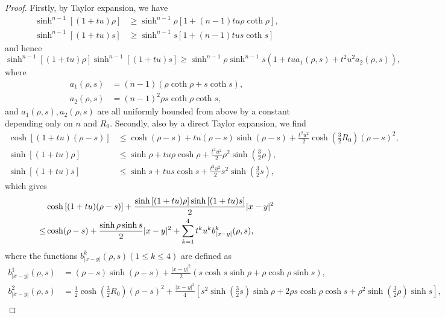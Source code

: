 \documentclass[11pt,reqno]{amsart}
\theoremstyle{definition}
\theoremstyle{remark}
\numberwithin{equation}{section}
\renewcommand{\(}{\left(}
\renewcommand{\)}{\right)}
\renewcommand{\-}{\overline}
\begin{document}
\begin{proof}
	Firstly, by Taylor expansion, we have 
	\begin{align*}
		\sinh^{n-1}\left[(1+tu)\rho\right]&\geq\sinh^{n-1}\rho\left[1+(n-1)tu\rho\coth\rho\right],\\
		\sinh^{n-1}\left[(1+tu)s\right]&\geq\sinh^{n-1}s\left[1+(n-1)tu s\coth s\right]
	\end{align*}
	and hence
	\begin{equation}\label{Eq-b1}
		\sinh^{n-1}\left[(1+tu)\rho\right]\sinh^{n-1}\left[(1+tu)s\right]\geq \sinh^{n-1}\rho\sinh^{n-1}s(1+tu a_1(\rho,s)+t^2u^2a_2(\rho,s)),
	\end{equation}
	where 
	\begin{align}
		a_1(\rho,s)&=(n-1)(\rho\coth\rho+s\coth s),\label{Eq-b2}\\
		a_2(\rho,s)&=(n-1)^2\rho s\coth\rho\coth s,\label{Eq-b3}
	\end{align}
	and $a_1(\rho,s), a_2(\rho,s)$ are all uniformly bounded from above by a constant depending only on $n$ and $R_0$. Secondly, also by a direct Taylor expansion, we find
	\begin{align*}
		\cosh\left[(1+tu)(\rho-s)\right]&\leq \cosh(\rho-s)+tu(\rho-s)\sinh(\rho-s)+\frac{t^2u^2}{2}\cosh\left(\frac{3}{2}R_0\right)(\rho-s)^2,\\
		\sinh\left[(1+tu)\rho\right]&\leq \sinh\rho+tu\rho\cosh\rho+\frac{t^2u^2}{2}\rho^2\sinh\left(\frac{3}{2}\rho\right),\\
		\sinh\left[(1+tu)s\right]&\leq \sinh s+tu s\cosh s+\frac{t^2u^2}{2}s^2\sinh\left(\frac{3}{2}s\right),
	\end{align*}
	which gives
	\begin{align}
		&\cosh\left[(1+tu)(\rho-s)\right]+\frac{\sinh\left[(1+tu)\rho\right]	\sinh\left[(1+tu)s\right]}{2}|x-y|^2\notag\\
		\leq&\cosh(\rho-s)+\frac{\sinh\rho\sinh s}{2}|x-y|^2+\sum_{k=1}^4{t^k u^k}b^k_{|x-y|}(\rho,s),\label{Eq-b4}
	\end{align}
	where the functions $b^k_{|x-y|}(\rho,s)(1\leq k\leq 4)$ are defined as
	\begin{align*}
		b^1_{|x-y|}(\rho,s)&=(\rho-s)\sinh(\rho-s)+\frac{|x-y|^2}{2}(s\cosh s\sinh\rho+\rho\cosh\rho\sinh s),\\
		b^2_{|x-y|}(\rho,s)&=\frac{1}{2}\cosh\left(\frac{3}{2}R_0\right)(\rho-s)^2+\frac{|x-y|^2}{4}\left[s^2\sinh\left(\frac{3}{2}s\right)\sinh\rho+2\rho s\cosh\rho\cosh s+\rho^2\sinh\left(\frac{3}{2}\rho\right)\sinh s\right],\\

\end{align*}
\end{proof}
\end{document}
